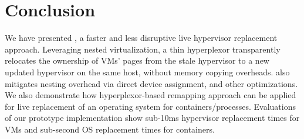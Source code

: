 \vspace{-0.2in}
\section{Conclusion}
We have presented \arch, a faster and less disruptive live hypervisor replacement approach.
Leveraging nested virtualization, a thin hyperplexor transparently 
relocates the ownership of VMs' pages from the stale hypervisor to a new updated hypervisor on 
the same host, without memory copying overheads.
\arch also mitigates nesting overhead via direct device assignment, and other optimizations. 
We also demonstrate how hyperplexor-based remapping approach 
can be applied for live replacement of an 
operating system for containers/processes.
Evaluations of our \arch prototype implementation show sub-10ms hypervisor replacement
times for VMs and sub-second OS replacement times for containers.


